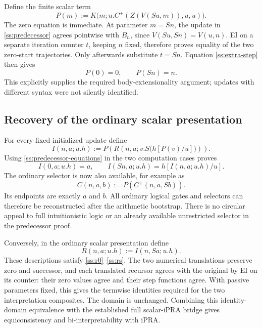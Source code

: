 \documentclass[11pt,letterpaper]{article}
\theoremstyle{definition}\newtheorem{definition}[theorem]{Definition}
\theoremstyle{remark}\newtheorem{remark}[theorem]{Remark}
\begin{document}
Define the finite scalar term
\begin{equation}
 P(m):=K\bigl(m;u.C^+(Z(V(Su,m)),u,u)\bigr).
 \label{ss:predecessor}
\end{equation}
The zero equation is immediate.  At parameter $m=Sn$, the update in
\eqref{ss:predecessor} agrees pointwise with $B_n$, since
$V(Su,Sn)=V(u,n)$.  EI on a separate iteration counter $t$, keeping
$n$ fixed, therefore proves equality of the two zero-start trajectories.
Only afterwards substitute $t=Sn$.  Equation \eqref{ss:extra-step}
then gives
\begin{equation}
                         P(0)=0,\qquad P(Sn)=n.
 \label{ss:predecessor-equations}
\end{equation}
This explicitly supplies the required body-extensionality argument;
updates with different syntax were not silently identified.

\subsection{Recovery of the ordinary scalar presentation}

For every fixed initialized update define
\begin{equation}
 I(n,a;u.h):=
 P\!\left(R\left(n,a;v.S\bigl(h[P(v)/u]\bigr)\right)\right).
 \label{ss:initialized-compiler}
\end{equation}
Using \eqref{ss:predecessor-equations} in the two computation cases
proves
\[
 I(0,a;u.h)=a,\qquad
 I(Sn,a;u.h)=h[I(n,a;u.h)/u].
\]
The ordinary selector is now also available, for example as
\[
 C(n,a,b):=P(C^+(n,a,Sb)).
\]
Its endpoints are exactly $a$ and $b$.  All ordinary logical gates and
selectors can therefore be reconstructed after the arithmetic
bootstrap.  There is no circular appeal to full intuitionistic logic
or an already available unrestricted selector in the predecessor proof.

Conversely, in the ordinary scalar presentation define
\[
                    R(n,a;u.h):=I(n,Sa;u.h).
\]
These descriptions satisfy \eqref{ss:r0}--\eqref{ss:rs}.  The two
numerical translations preserve zero and successor, and each translated
recursor agrees with the original by EI on its counter: their zero
values agree and their step functions agree.  With passive parameters
fixed, this gives the termwise identities required for the two
interpretation composites.  The domain is unchanged.  Combining this
identity-domain equivalence with the established full scalar-iPRA
bridge gives equiconsistency and bi-interpretability with iPRA.
\end{document}
